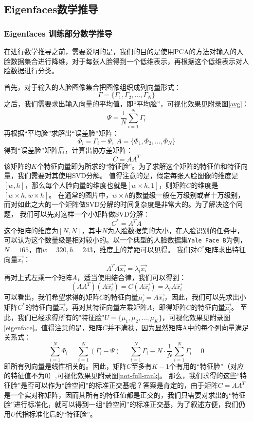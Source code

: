 \documentclass{ctexart}
\begin{document}
    \subsection{Eigenfaces数学推导}
    \subsubsection{Eigenfaces 训练部分数学推导}
    在进行数学推导之前，需要说明的是，我们的目的是使用PCA的方法对输入的人脸数据集合进行降维，对于每张人脸得到一个低维表示，再根据这个低维表示对人脸数据进行分类。
    
    \noindent
    首先，对于输入的人脸图像集合把图像组织成列向量形式：
    $$
    \Gamma = \{\Gamma_1, \Gamma_2, \dots ,\Gamma_N \}
    $$
    之后，我们需要求出输入向量的平均值，即“平均脸”，可视化效果见附录图\ref{avg}：
    $$
    \Psi = \frac{1}{N}\sum_{i=1}^{N}\Gamma_i
    $$
    再根据“平均脸”求解出“误差脸”矩阵：
    $$
    \Phi_i = \Gamma_i - \Psi,\ A = \{ \Phi_1, \Phi_2,\dots,\Phi_N \}
    $$
    得到“误差脸”矩阵后，计算出协方差矩阵：
    $$
    C = AA^T
    $$
    该矩阵的$K$个特征向量即为所求的“特征脸”。为了求解这个矩阵的特征值和特征向量，我们需要对其使用SVD分解。
    值得注意的是，假定每张人脸图像的维度是$[w,h]$，那么每个人脸向量的维度也就是$[w\times h,1]$，则矩阵$C$的维度是$[w\times h,w \times h]$。
    在通常的图片中，$w \times h$的数量级一般在万级别或者十万级别，而对如此之大的一个矩阵做SVD分解的时间复杂度是非常大的。为了解决这个问题，
    我们可以先对这样一个小矩阵做SVD分解：
    $$
    C^* = A^TA
    $$
    这个矩阵的维度为$[N,N]$，其中$N$为人脸数据集的大小，在人脸识别的任务中，可以认为这个数量级是相对较小的。以一个典型的人脸数据集\texttt{Yale Face B}\cite{GeBeKr01}为例，$N=165$，而$w=320,h=243$，维度上的差距可以见得。
    我们对$C^*$矩阵求出特征向量$\vec{x_i}$：
    $$
    A^TA\vec{x_i} = \lambda_i \vec{x_i}
    $$
    再对上式左乘一个矩阵$A$，适当使用结合律，我们可以得到：
    $$
    (AA^T)(A\vec{x_i}) = C(A\vec{x_i}) = \lambda_i A \vec{x_i}
    $$
    可以看出，我们希望求得的矩阵$C$的特征向量$\vec{\mu_i}=A\vec{x_i}$，因此，我们可以先求出小矩阵$C^*$的特征向量$\vec{x_i}$，再对其特征向量左乘矩阵$A$，即得矩阵$C$的特征向量$\vec{\mu_i}$。
    至此，我们已经求得所有的"特征脸"$U=\{\mu_1, \mu_2,\dots,\mu_K \}$，可视化效果见附录图\ref{eigenface}。值得注意的是，矩阵$C$并不满秩，因为显然矩阵A中的每个列向量满足关系式：
    $$
    \sum_{i=1}^N\Phi_i = \sum_{i=1}^N(\Gamma_i-\Psi)=\sum_{i=1}^N\Gamma_i-N\cdot \frac{1}{N}\sum_{i=1}^N\Gamma_i=0
    $$
    即所有列向量是线性相关的。因此，矩阵$C$至多有$K-1$个有用的“特征脸”（对应的特征值不为0）,可视化效果见附录图\ref{not-full-rank}。
    那么，我们求得的这些“特征脸”是否可以作为“脸空间”的标准正交基呢？答案是肯定的，由于矩阵$C=AA^T$是一个实对称矩阵，因而其所有的特征值都是正交的，我们只需要对求出的“特征脸”进行标准化，就可以得到一组“脸空间”的标准正交基，为了叙述方便，我们仍用$U$代指标准化后的“特征脸”。
    
\end{document}
